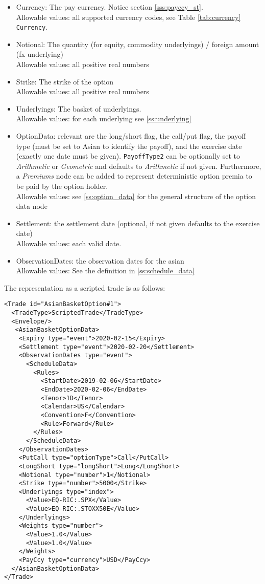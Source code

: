 \begin{itemize}
\item Currency: The pay currency. Notice section \ref{sss:payccy_st}. \\
  Allowable values: all supported currency codes, see Table \ref{tab:currency} \lstinline!Currency!.
\item Notional: The quantity (for equity, commodity underlyings) / foreign amount (fx underlying) \\
  Allowable values: all positive real numbers
\item Strike: The strike of the option \\
  Allowable values: all positive real numbers
\item Underlyings: The basket of underlyings. \\
  Allowable values: for each underlying see \ref{ss:underlying}
\item OptionData: relevant are the long/short flag, the call/put flag, the payoff type (must be set to Asian to
  identify the payoff), and the exercise date (exactly one date must be given). \lstinline!PayoffType2! can be optionally set to \emph{Arithmetic} or \emph{Geometric} and defaults to \emph{Arithmetic} if not given. Furthermore, a \emph{Premiums} node can be added to represent deterministic option premia to be paid by the option holder. \\
  Allowable values: see \ref{ss:option_data} for the general structure of the option data node
\item Settlement: the settlement date (optional, if not given defaults to the exercise date) \\
  Allowable values: each valid date.
\item ObservationDates: the observation dates for the asian \\
  Allowable values: See the definition in \ref{ss:schedule_data}
\end{itemize}

The representation as a scripted trade is as follows:

\begin{verbatim}
<Trade id="AsianBasketOption#1">
  <TradeType>ScriptedTrade</TradeType>
  <Envelope/>
   <AsianBasketOptionData>
    <Expiry type="event">2020-02-15</Expiry>
    <Settlement type="event">2020-02-20</Settlement>
    <ObservationDates type="event">
      <ScheduleData>
        <Rules>
          <StartDate>2019-02-06</StartDate>
          <EndDate>2020-02-06</EndDate>
          <Tenor>1D</Tenor>
          <Calendar>US</Calendar>
          <Convention>F</Convention>
          <Rule>Forward</Rule>
        </Rules>
      </ScheduleData>
    </ObservationDates>
    <PutCall type="optionType">Call</PutCall>
    <LongShort type="longShort">Long</LongShort>
    <Notional type="number">1</Notional>
    <Strike type="number">5000</Strike>
    <Underlyings type="index">
      <Value>EQ-RIC:.SPX</Value>
      <Value>EQ-RIC:.STOXX50E</Value>
    </Underlyings>
    <Weights type="number">
      <Value>1.0</Value>
      <Value>1.0</Value>
    </Weights>
    <PayCcy type="currency">USD</PayCcy>
  </AsianBasketOptionData>
</Trade>
\end{verbatim}

